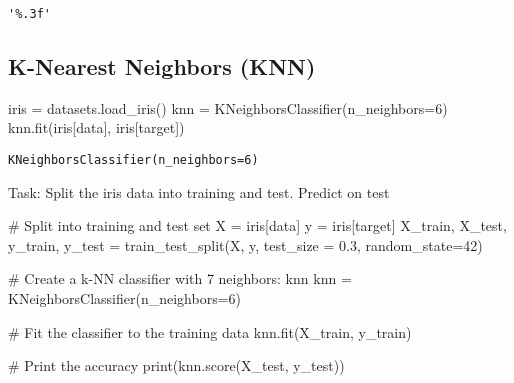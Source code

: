 \documentclass[
  letterpaper,
  DIV=11,
  numbers=noendperiod]{scrreprt}
\newenvironment{Shaded}{\begin{snugshade}}{\end{snugshade}}
\newcommand{\BuiltInTok}[1]{\textcolor[rgb]{0.00,0.23,0.31}{#1}}
\newcommand{\CommentTok}[1]{\textcolor[rgb]{0.37,0.37,0.37}{#1}}
\newcommand{\DecValTok}[1]{\textcolor[rgb]{0.68,0.00,0.00}{#1}}
\newcommand{\FloatTok}[1]{\textcolor[rgb]{0.68,0.00,0.00}{#1}}
\newcommand{\NormalTok}[1]{\textcolor[rgb]{0.00,0.23,0.31}{#1}}
\newcommand{\OperatorTok}[1]{\textcolor[rgb]{0.37,0.37,0.37}{#1}}
\newcommand{\StringTok}[1]{\textcolor[rgb]{0.13,0.47,0.30}{#1}}
\begin{document}
\begin{verbatim}
'%.3f'
\end{verbatim}

\hypertarget{k-nearest-neighbors-knn}{%
\subsection{K-Nearest Neighbors (KNN)}\label{k-nearest-neighbors-knn}}

\begin{Shaded}
\begin{Highlighting}[]
\NormalTok{iris }\OperatorTok{=}\NormalTok{ datasets.load\_iris()}
\NormalTok{knn }\OperatorTok{=}\NormalTok{ KNeighborsClassifier(n\_neighbors}\OperatorTok{=}\DecValTok{6}\NormalTok{)}
\NormalTok{knn.fit(iris[}\StringTok{\textquotesingle{}data\textquotesingle{}}\NormalTok{], iris[}\StringTok{\textquotesingle{}target\textquotesingle{}}\NormalTok{])}
\end{Highlighting}
\end{Shaded}

\begin{verbatim}
KNeighborsClassifier(n_neighbors=6)
\end{verbatim}

Task: Split the iris data into training and test. Predict on test

\begin{Shaded}
\begin{Highlighting}[]
\CommentTok{\# Split into training and test set}
\NormalTok{X }\OperatorTok{=}\NormalTok{ iris[}\StringTok{\textquotesingle{}data\textquotesingle{}}\NormalTok{]}
\NormalTok{y }\OperatorTok{=}\NormalTok{ iris[}\StringTok{\textquotesingle{}target\textquotesingle{}}\NormalTok{]}
\NormalTok{X\_train, X\_test, y\_train, y\_test }\OperatorTok{=}\NormalTok{ train\_test\_split(X, y, test\_size }\OperatorTok{=} \FloatTok{0.3}\NormalTok{, random\_state}\OperatorTok{=}\DecValTok{42}\NormalTok{)}

\CommentTok{\# Create a k{-}NN classifier with 7 neighbors: knn}
\NormalTok{knn }\OperatorTok{=}\NormalTok{ KNeighborsClassifier(n\_neighbors}\OperatorTok{=}\DecValTok{6}\NormalTok{)}

\CommentTok{\# Fit the classifier to the training data}
\NormalTok{knn.fit(X\_train, y\_train)}

\CommentTok{\# Print the accuracy}
\BuiltInTok{print}\NormalTok{(knn.score(X\_test, y\_test))}
\end{Highlighting}
\end{Shaded}
\end{document}
